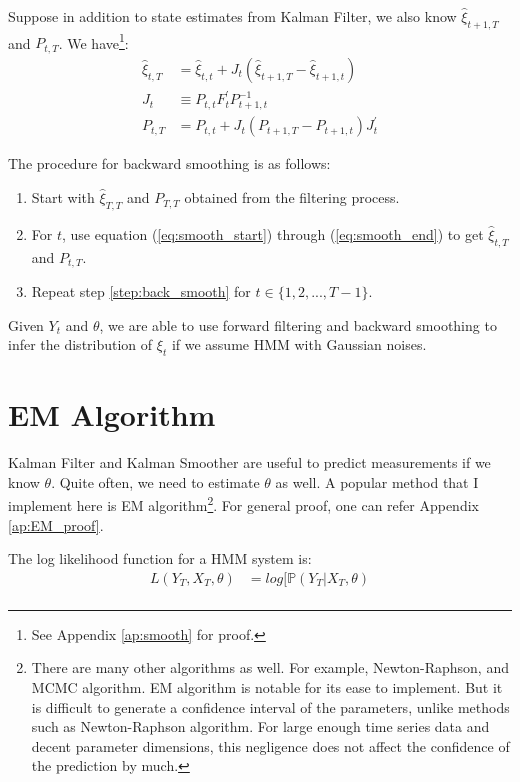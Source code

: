 \documentclass[12pt]{article}
\newenvironment{boenumerate}
    {\begin{enumerate}\renewcommand\labelenumi{\textbf\theenumi}}
    {\end{enumerate}}
\numberwithin{equation}{section}
\begin{document}
Suppose in addition to state estimates from Kalman Filter, we also know $\hat{\xi}_{t+1,T}$ and $P_{t,T}$. We have\footnote{See Appendix \ref{ap:smooth} for proof.}:
\begin{align}
    \hat{\xi}_{t,T} &= \hat{\xi}_{t,t} + J_t(\hat{\xi}_{t+1,T}-\hat{\xi}_{t+1,t}) \label{eq:smooth_start} \\
    J_t & \equiv P_{t,t}F_t^{'}P_{t+1,t}^{-1} \\
    P_{t,T} &= P_{t,t} + J_t(P_{t+1,T}-P_{t+1,t})J_t^{'} \label{eq:smooth_end}
\end{align}

The procedure for backward smoothing is as follows:
\begin{boenumerate}
    \item Start with $\hat{\xi}_{T,T}$ and $P_{T,T}$ obtained from the filtering process.
    \item \label{step:back_smooth} For $t$, use equation (\ref{eq:smooth_start}) through (\ref{eq:smooth_end}) to get $\hat{\xi}_{t,T}$ and $P_{t,T}$.
    \item Repeat step \ref{step:back_smooth} for $t \in \{1,2,...,T-1\}$.
\end{boenumerate}

Given $Y_t$ and $\theta$, we are able to use forward filtering and backward smoothing to infer the distribution of $\xi_t$ if we assume HMM with Gaussian noises. 

\section{EM Algorithm} \label{sec:EM}
Kalman Filter and Kalman Smoother are useful to predict measurements if we know $\theta$. Quite often, we need to estimate $\theta$ as well. A popular method that I implement here is EM algorithm\footnote{There are many other algorithms as well. For example, Newton-Raphson, and MCMC algorithm. EM algorithm is notable for its ease to implement. But it is difficult to generate a confidence interval of the parameters, unlike methods such as Newton-Raphson algorithm. For large enough time series data and decent parameter dimensions, this negligence does not affect the confidence of the prediction by much.}. For general proof, one can refer Appendix \ref{ap:EM_proof}.

The log likelihood function for a HMM system is:
\begin{align*}
    L(Y_T,X_T, \theta) &= log[\mathbb{P}(Y_T|X_T,\theta) \\
\end{align*}
\end{document}
